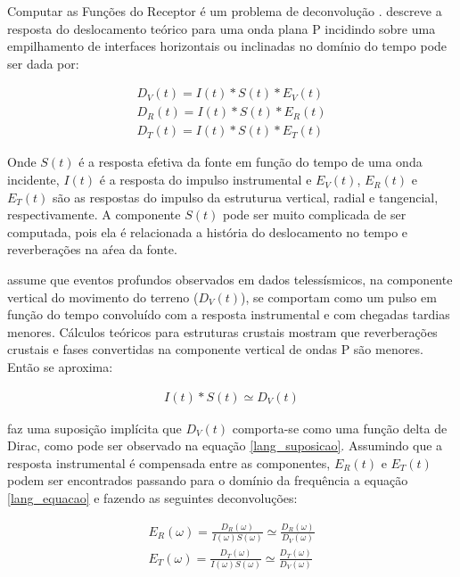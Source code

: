 Computar as Funções do Receptor é um problema de deconvolução \citep{ligorria_iterative_1999}. \cite{langston_structure_1979} descreve a resposta do deslocamento teórico para uma onda plana P incidindo sobre uma empilhamento de interfaces horizontais ou inclinadas no domínio do tempo pode ser dada por:

\begin{eqnarray} \label{lang_equacao}
D_{V}(t) = I(t) * S(t) * E_{V}(t)
\nonumber
\\
D_{R}(t) = I(t) * S(t) * E_{R}(t)
\\
\nonumber
D_{T}(t) = I(t) * S(t) * E_{T}(t)
\end{eqnarray}

Onde $S(t)$ é a resposta efetiva da fonte em função do tempo de uma onda incidente, $I(t)$ é a resposta do impulso instrumental e $E_{V}(t)$, $E_{R}(t)$ e $E_{T}(t)$ são as respostas do impulso da estruturua vertical, radial e tangencial, respectivamente. A componente $S(t)$ pode ser muito complicada de ser computada, pois ela é relacionada a história do deslocamento no tempo e reverberações na aŕea da fonte.

\cite{langston_structure_1979} assume que eventos profundos observados em dados telessísmicos, na componente vertical do movimento do terreno ($D_{V}(t)$), se comportam como um pulso em função do tempo convoluído com a resposta instrumental e com chegadas tardias menores. Cálculos teóricos para estruturas crustais mostram que reverberações crustais e fases convertidas na componente vertical de ondas P são menores. Então se aproxima:

\begin{eqnarray} \label{lang_suposicao}
I(t) * S(t) \simeq D_{V}(t)
\end{eqnarray}

\cite{langston_structure_1979} faz uma suposição implícita que $D_{V}(t)$ comporta-se como uma função delta de Dirac, como pode ser observado na equação \ref{lang_suposicao}. Assumindo que a resposta instrumental é compensada entre as componentes, $E_{R}(t)$ e $E_{T}(t)$ podem ser encontrados passando para o domínio da frequência a equação \ref{lang_equacao} e fazendo as seguintes deconvoluções:

\begin{eqnarray} \label{lang_resposta}
E_{R}(\omega) =  \frac{D_{R}(\omega)}{I(\omega)S(\omega)} \simeq \frac{D_{R}(\omega)}{D_{V}(\omega)}
\\ \nonumber
E_{T}(\omega) =  \frac{D_{T}(\omega)}{I(\omega)S(\omega)} \simeq \frac{D_{T}(\omega)}{D_{V}(\omega)}
\end{eqnarray}

